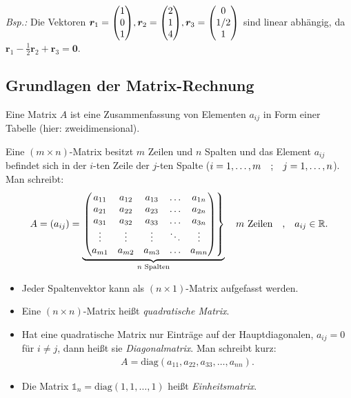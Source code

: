 \emph{Bsp.:} Die Vektoren $\bm{r}_1 = \mqty(1\\0\\1), \bm{r}_2 = \mqty(2\\1\\4), \bm{r}_3 = \mqty(0\\1/2\\1)$ sind linear abhängig, da $\bm{r}_1 - \frac{1}{2}\bm{r}_2 + \bm{r}_3 = \bm{0}$.

\subsection{Grundlagen der Matrix-Rechnung}

Eine Matrix $A$ ist eine Zusammenfassung von Elementen $a_{ij}$ in Form einer Tabelle (hier: zweidimensional). 

Eine $(m\times n)$-Matrix besitzt $m$ Zeilen und $n$ Spalten und das Element $a_{ij}$ befindet sich in der $i$-ten Zeile der $j$-ten Spalte ($i= 1,\hdots,m\qq{;} j=1,\hdots,n$). Man schreibt: 
\begin{align}
    A = (a_{ij}) = 
        \underbrace{\begin{rcases}\mqty(a_{11} & a_{12} & a_{13} & \hdots & a_{1n} \\
        a_{21} & a_{22} & a_{23} & \hdots & a_{2n} \\
        a_{31} & a_{32} & a_{33} & \hdots & a_{3n} \\
        \vdots & \vdots & \vdots & \ddots & \vdots \\
        a_{m1} & a_{m2} & a_{m3} & \hdots & a_{mn})
        \end{rcases}}_{n \text{ Spalten}} 
        \quad m \text{ Zeilen} \qq{,} a_{ij} \in \mathbb{R}.
\end{align}

\begin{itemize}
    \item Jeder Spaltenvektor kann als $(n\times 1)$-Matrix aufgefasst werden. 
    \item Eine $(n\times n)$-Matrix heißt \emph{quadratische Matrix}. 
    \item Hat eine quadratische Matrix nur Einträge auf der Hauptdiagonalen, $a_{ij} = 0$ für $i\neq j$, dann heißt sie \emph{Diagonalmatrix}. Man schreibt kurz: 
    \begin{align}
        A = \text{diag}(a_{11}, a_{22}, a_{33}, \hdots, a_{nn}).
    \end{align}
    \item Die Matrix $\mathds{1}_n = \text{diag}(1,1,\hdots,1)$ heißt \emph{Einheitsmatrix}.
\end{itemize}

